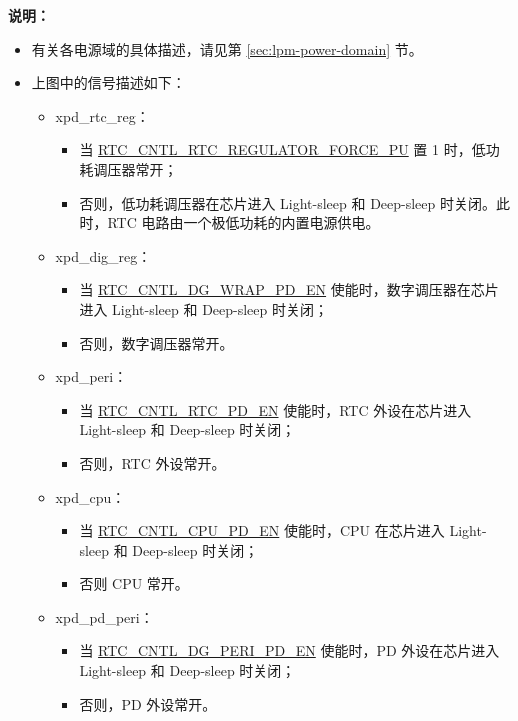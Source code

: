 \documentclass[main\_\_CN.tex]{subfiles}
\begin{document}
\textbf{说明：}
\begin{itemize}
    \item 有关各电源域的具体描述，请见第 \ref{sec:lpm-power-domain} 节。
    \item 上图中的信号描述如下：
    \begin{itemize}
        \item xpd\_rtc\_reg：
        \begin{itemize}
            \item 当 \hyperref[fielddesc:RTCCNTLRTCREGULATORFORCEPU]{RTC\_CNTL\_RTC\_REGULATOR\_FORCE\_PU} 置 1 时，低功耗调压器常开；
            \item 否则，低功耗调压器在芯片进入 Light-sleep 和 Deep-sleep 时关闭。此时，RTC 电路由一个极低功耗的内置电源供电。
        \end{itemize}
        \item xpd\_dig\_reg：
        \begin{itemize}
            \item 当 \hyperref[fielddesc:RTCCNTLDGWRAPPDEN]{RTC\_CNTL\_DG\_WRAP\_PD\_EN} 使能时，数字调压器在芯片进入 Light-sleep 和 Deep-sleep 时关闭；
            \item 否则，数字调压器常开。
        \end{itemize}
        \item xpd\_peri：
        \begin{itemize}
            \item 当 \hyperref[fielddesc:RTCCNTLDGWRAPPDEN]{RTC\_CNTL\_RTC\_PD\_EN} 使能时，RTC 外设在芯片进入 Light-sleep 和 Deep-sleep 时关闭；
            \item 否则，RTC 外设常开。
        \end{itemize}

        \item xpd\_cpu：
        \begin{itemize}
            \item 当 \hyperref[fielddesc:RTCCNTLDGWRAPPDEN]{RTC\_CNTL\_CPU\_PD\_EN} 使能时，CPU 在芯片进入 Light-sleep 和 Deep-sleep 时关闭；
            \item 否则 CPU 常开。
        \end{itemize}

        \item xpd\_pd\_peri：
        \begin{itemize}
            \item 当 \hyperref[fielddesc:RTCCNTLDGWRAPPDEN]{RTC\_CNTL\_DG\_PERI\_PD\_EN} 使能时，PD 外设在芯片进入 Light-sleep 和 Deep-sleep 时关闭；
            \item 否则，PD 外设常开。
        \end{itemize}


\end{itemize}
\end{itemize}
\end{document}

